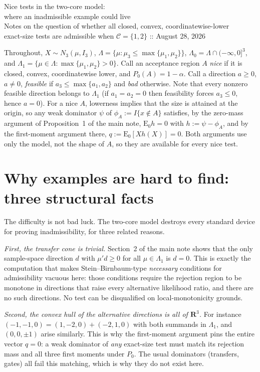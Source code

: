 \documentclass[12pt]{article}
\theoremstyle{remark}
\newcommand{\E}{\mathrm{E}}
\newcommand{\R}{\mathbf R}
\begin{document}
\begin{center}
{\Large Nice tests in the two-core model:\\[2pt] where an inadmissible example could live}\\[4pt]
{\small Notes on the question of whether all closed, convex, coordinatewise-lower\\
exact-size tests are admissible when $\mathcal C=\{1,2\}$ :: August 28, 2026}
\end{center}

\medskip

Throughout, $X\sim N_3(\mu,I_3)$, $\Lambda=\{\mu:\mu_3\le\max\{\mu_1,\mu_2\}\}$,
$\Lambda_0=\Lambda\cap(-\infty,0]^3$, and
$\Lambda_1=\{\mu\in\Lambda:\max\{\mu_1,\mu_2\}>0\}$. Call an acceptance region
$A$ \emph{nice} if it is closed, convex, coordinatewise lower, and
$P_0(A)=1-\alpha$. Call a direction $a\ge0$, $a\ne0$, \emph{feasible} if
$a_3\le\max\{a_1,a_2\}$ and \emph{bad} otherwise. Note that every nonzero
feasible direction belongs to $\Lambda_1$ (if $a_1=a_2=0$ then feasibility
forces $a_3\le0$, hence $a=0$). For a nice $A$, lowerness implies that the
size is attained at the origin, so any weak dominator $\psi$ of
$\phi_A:=I\{x\notin A\}$ satisfies, by the zero-mass argument of
Proposition~1 of the main note, $\E_0h=0$ with $h:=\psi-\phi_A$, and by the
first-moment argument there, $q:=\E_0[Xh(X)]=0$. Both arguments use only the
model, not the shape of $A$, so they are available for every nice test.

\section{Why examples are hard to find: three structural facts}

The difficulty is not bad luck. The two-core model destroys every standard
device for proving inadmissibility, for three related reasons.

\emph{First, the transfer cone is trivial.} Section~2 of the main note shows
that the only sample-space direction $d$ with $\mu'd\ge0$ for all
$\mu\in\Lambda_1$ is $d=0$. This is exactly the computation that makes
Stein--Birnbaum-type \emph{necessary} conditions for admissibility vacuous
here: those conditions require the rejection region to be monotone in
directions that raise every alternative likelihood ratio, and there are no
such directions. No test can be disqualified on local-monotonicity grounds.

\emph{Second, the convex hull of the alternative directions is all of
$\R^3$.} For instance $(-1,-1,0)=(1,-2,0)+(-2,1,0)$ with both summands in
$\Lambda_1$, and $(0,0,\pm1)$ arise similarly. This is why the first-moment
argument pins the entire vector $q=0$: a weak dominator of \emph{any}
exact-size test must match its rejection mass and all three first moments
under $P_0$. The usual dominators (transfers, gates) all fail this matching,
which is why they do not exist here.
\end{document}
